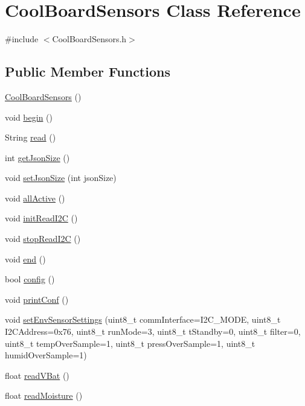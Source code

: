 \hypertarget{class_cool_board_sensors}{}\section{Cool\+Board\+Sensors Class Reference}
\label{class_cool_board_sensors}


{\ttfamily \#include $<$Cool\+Board\+Sensors.\+h$>$}

\subsection*{Public Member Functions}
\begin{DoxyCompactItemize}
\item 
\hyperlink{class_cool_board_sensors_a91ff2a02f5486f90cf2413a1cf8a9ed4}{Cool\+Board\+Sensors} ()
\item 
void \hyperlink{class_cool_board_sensors_a97095823ef7c8f5290812f1405b966b3}{begin} ()
\item 
String \hyperlink{class_cool_board_sensors_a91badb2539d91fda8679f2a597874c48}{read} ()
\item 
int \hyperlink{class_cool_board_sensors_ab82c2a1633768ccd12a589320fa31a14}{get\+Json\+Size} ()
\item 
void \hyperlink{class_cool_board_sensors_ab76e6dbd6efbcc25ff460535badd8d45}{set\+Json\+Size} (int json\+Size)
\item 
void \hyperlink{class_cool_board_sensors_aa432c5aac88f89c31a10766390f23e0b}{all\+Active} ()
\item 
void \hyperlink{class_cool_board_sensors_acad6a8418c66d36868caca23c844ecb6}{init\+Read\+I2C} ()
\item 
void \hyperlink{class_cool_board_sensors_ab67b900b9e5e7c18d52d2d9107ba171b}{stop\+Read\+I2C} ()
\item 
void \hyperlink{class_cool_board_sensors_a4902b69f6e628bd6557193758fdd2bae}{end} ()
\item 
bool \hyperlink{class_cool_board_sensors_a9a218895c5423375c33c08f2c56fb23a}{config} ()
\item 
void \hyperlink{class_cool_board_sensors_af6fd79505815b204c178617ecf54c873}{print\+Conf} ()
\item 
void \hyperlink{class_cool_board_sensors_a406307ffd70272282d91479c7ed8d66f}{set\+Env\+Sensor\+Settings} (uint8\+\_\+t comm\+Interface=I2\+C\+\_\+\+M\+O\+DE, uint8\+\_\+t I2\+C\+Address=0x76, uint8\+\_\+t run\+Mode=3, uint8\+\_\+t t\+Standby=0, uint8\+\_\+t filter=0, uint8\+\_\+t temp\+Over\+Sample=1, uint8\+\_\+t press\+Over\+Sample=1, uint8\+\_\+t humid\+Over\+Sample=1)
\item 
float \hyperlink{class_cool_board_sensors_a6944b6ea7bce8e2fce1b434acfd9d5f3}{read\+V\+Bat} ()
\item 
float \hyperlink{class_cool_board_sensors_a8761bff50373c485f4465c8db47d0633}{read\+Moisture} ()
\end{DoxyCompactItemize}
